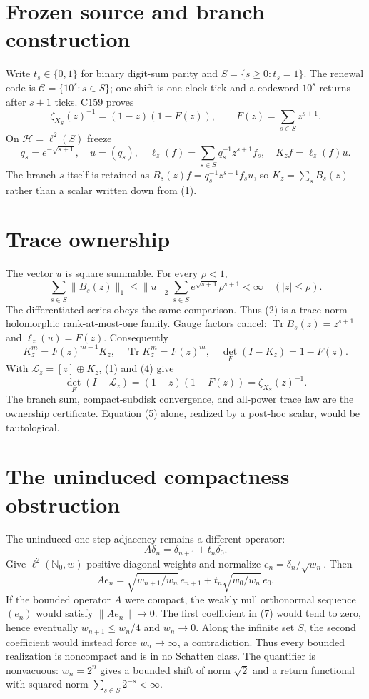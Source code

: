 \documentclass[10pt]{article}
\begin{document}
\section{Frozen source and branch construction}
Write $t_s\in\{0,1\}$ for binary digit-sum parity and
$S=\{s\geq0:t_s=1\}$.  The renewal code is
$\mathcal C=\{10^s:s\in S\}$; one shift is one clock tick and a codeword
$10^s$ returns after $s+1$ ticks.  C159 proves
\[
 \zeta_{X_S}(z)^{-1}=(1-z)(1-F(z)),\qquad
 F(z)=\sum_{s\in S}z^{s+1}.                         \tag{1}
\]
On $\mathcal H=\ell^2(S)$ freeze
\[
 q_s=e^{-\sqrt{s+1}},\quad u=(q_s),\quad
 \ell_z(f)=\sum_{s\in S}q_s^{-1}z^{s+1}f_s,
 \quad K_zf=\ell_z(f)u.                              \tag{2}
\]
The branch $s$ itself is retained as
$B_s(z)f=q_s^{-1}z^{s+1}f_su$, so $K_z=\sum_sB_s(z)$ rather than a scalar
written down from (1).

\section{Trace ownership}
The vector $u$ is square summable.  For every $\rho<1$,
\[
 \sum_{s\in S}\|B_s(z)\|_1
 \leq \|u\|_2\sum_{s\in S}e^{\sqrt{s+1}}\rho^{s+1}<\infty
 \quad(|z|\leq\rho).                                  \tag{3}
\]
The differentiated series obeys the same comparison.  Thus (2) is a
trace-norm holomorphic rank-at-most-one family.  Gauge factors cancel:
$\operatorname{Tr}B_s(z)=z^{s+1}$ and
$\ell_z(u)=F(z)$.  Consequently
\[
 K_z^m=F(z)^{m-1}K_z,\quad
 \operatorname{Tr}K_z^m=F(z)^m,
 \quad\det_F(I-K_z)=1-F(z).                            \tag{4}
\]
With $\mathcal L_z=[z]\oplus K_z$, (1) and (4) give
\[
 \det_F(I-\mathcal L_z)=(1-z)(1-F(z))=\zeta_{X_S}(z)^{-1}. \tag{5}
\]
The branch sum, compact-subdisk convergence, and all-power trace law are the
ownership certificate.  Equation (5) alone, realized by a post-hoc scalar,
would be tautological.

\section{The uninduced compactness obstruction}
The uninduced one-step adjacency remains a different operator:
\[
 A\delta_n=\delta_{n+1}+t_n\delta_0.                    \tag{6}
\]
Give $\ell^2(\mathbb N_0,w)$ positive diagonal weights and normalize
$e_n=\delta_n/\sqrt{w_n}$.  Then
\[
 Ae_n=\sqrt{w_{n+1}/w_n}\,e_{n+1}
      +t_n\sqrt{w_0/w_n}\,e_0.                           \tag{7}
\]
If the bounded operator $A$ were compact, the weakly null orthonormal
sequence $(e_n)$ would satisfy $\|Ae_n\|\to0$.  The first coefficient in
(7) would tend to zero, hence eventually $w_{n+1}\leq w_n/4$ and $w_n\to0$.
Along the infinite set $S$, the second coefficient would instead force
$w_n\to\infty$, a contradiction.  Thus every bounded realization is
noncompact and is in no Schatten class.  The quantifier is nonvacuous:
$w_n=2^n$ gives a bounded shift of norm $\sqrt2$ and a return functional
with squared norm $\sum_{s\in S}2^{-s}<\infty$.
\end{document}
